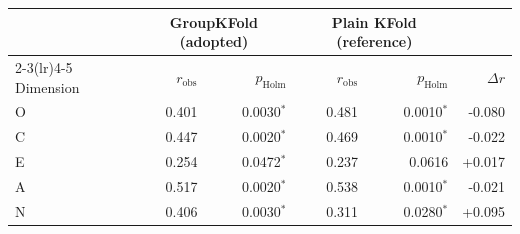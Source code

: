 \begin{tabular}{lrrrrr}
\toprule
 & \multicolumn{2}{c}{GroupKFold (adopted)} & \multicolumn{2}{c}{Plain KFold (reference)} & \\
\cmidrule(lr){2-3}\cmidrule(lr){4-5}
Dimension & $r_{\mathrm{obs}}$ & $p_{\mathrm{Holm}}$ & $r_{\mathrm{obs}}$ & $p_{\mathrm{Holm}}$ & $\Delta r$ \\
\midrule
O & 0.401 & 0.0030$^{*}$ & 0.481 & 0.0010$^{*}$ & -0.080 \\
C & 0.447 & 0.0020$^{*}$ & 0.469 & 0.0010$^{*}$ & -0.022 \\
E & 0.254 & 0.0472$^{*}$ & 0.237 & 0.0616 & +0.017 \\
A & 0.517 & 0.0020$^{*}$ & 0.538 & 0.0010$^{*}$ & -0.021 \\
N & 0.406 & 0.0030$^{*}$ & 0.311 & 0.0280$^{*}$ & +0.095 \\
\bottomrule
\end{tabular}

